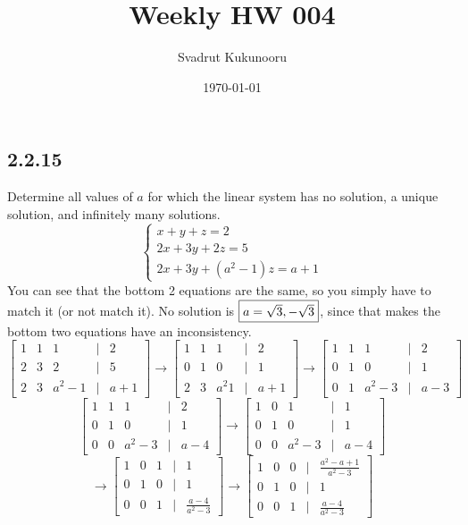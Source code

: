 \documentclass[letterpaper]{report}
\title{Weekly HW 004}
\author{Svadrut Kukunooru}
\date{\today}
\begin{document}
\begin{titlepage}
    \maketitle
\end{titlepage}
\subsection{2.2.15}%
\label{sub:1.5.15}

    Determine all values of $a$ for which the linear system has no solution, a unique solution, and infinitely many solutions. 
    \[
        \begin{cases}
    x + y + z = 2 \\
    2x + 3y + 2z = 5 \\
    2x + 3y + (a^2 - 1)z = a + 1
        \end{cases}
    \] 
    You can see that the bottom 2 equations are the same, so you simply have to match it (or not match it). 
No solution is $\fbox{$a = \sqrt{3}, -\sqrt{3}$}$, since that makes the bottom two equations have an inconsistency. 
\[
\begin{bmatrix} 
    1 & 1 & 1 & | & 2 \\
    2 & 3 & 2 & | & 5 \\
    2 & 3 & a^2 - 1 & | & a + 1 
\end{bmatrix} \to 
\begin{bmatrix} 
    1 & 1 & 1 & | & 2 \\
    0 & 1 & 0 & | & 1 \\
    2 & 3 & a^2 1  & | & a + 1 
\end{bmatrix} \to 
\begin{bmatrix} 
    1 & 1 & 1 & | & 2 \\
    0 & 1 & 0 & | & 1 \\
    0 & 1 & a^2 - 3 & | & a -3
\end{bmatrix} 
\] 
\[
\begin{bmatrix} 
    1 & 1 & 1 & | & 2 \\
    0 & 1 & 0 & | & 1 \\
    0 & 0 & a^2 - 3 & | & a - 4 
\end{bmatrix} \to 
\begin{bmatrix} 
    1 & 0 & 1 & | & 1 \\
    0 & 1 & 0 & | & 1 \\
    0 & 0 & a^2 - 3 & | & a - 4
\end{bmatrix} 
\] 
\[
\to 
\begin{bmatrix} 
    1 & 0 & 1 & | & 1 \\
    0 & 1 & 0 & | & 1 \\
    0 & 0 & 1 & | & \frac{a -4}{a^2 - 3}
\end{bmatrix}  \to 
\begin{bmatrix} 
    1 & 0 & 0 & | & \frac{a^2 -a + 1}{a^2 - 3} \\
    0 & 1 & 0 & | & 1 \\
    0 & 0 & 1 & | & \frac{a -4}{a^2 - 3}
\end{bmatrix} 
\] 
\end{document}

